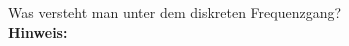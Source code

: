 \begin{question}[section=6,name={Diskreten Frequenzgang},difficulty=,type=mdl,tags={}]
	Was versteht man unter dem diskreten Frequenzgang?
	\\ \textbf{Hinweis:}\\
	
\end{question}
\begin{solution}
	
\end{solution}